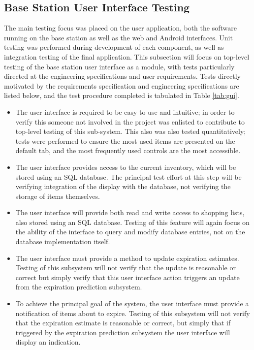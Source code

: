 \documentclass[11pt]{article} %
\begin{document}
\subsection{Base Station User Interface Testing}
The main testing focus was placed on the user application, both the software running on the base station as well as the web and Android interfaces.  Unit testing was performed during development of each component, as well as integration testing of the final application. This subsection will focus on top-level testing of the base station user interface as a module, with tests particularly directed at the engineering specifications and user requirements. Tests directly motivated by the requirements specification and engineering specifications are listed below, and the test procedure completed is tabulated in Table \ref{tab:gui}.
\begin{itemize}
\item The user interface is required to be easy to use and intuitive; in order to verify this someone not involved in the project was enlisted to contribute to top-level testing of this sub-system. This also was also tested quantitatively; tests were performed to ensure the most used items are presented on the default tab, and the most frequently used controls are the most accessible.
\item The user interface provides access to the current inventory, which will be stored using an SQL database. The principal test effort at this step will be verifying integration of the display with the database, not verifying the storage of items themselves.
\item The user interface will provide both read and write access to shopping lists, also stored using an SQL database. Testing of this feature will again focus on the ability of the interface to query and modify database entries, not on the database implementation itself.
\item The user interface must provide a method to update expiration estimates. Testing of this subsystem will not verify that the update is reasonable or correct but simply verify that this user interface action triggers an update from the expiration prediction subsystem.
\item To achieve the principal goal of the system, the user interface must provide a notification of items about to expire. Testing of this subsystem will not verify that the expiration estimate is reasonable or correct, but simply that if triggered by the expiration prediction subsystem the user interface will display an indication.
\end{itemize}
\end{document}
